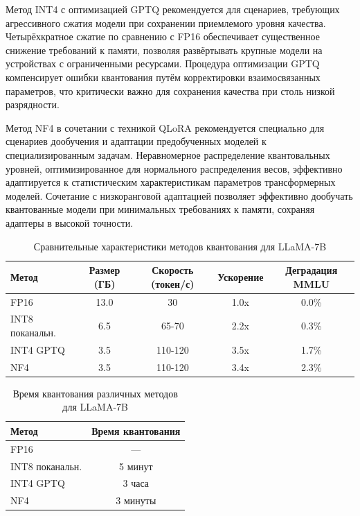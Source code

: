 \documentclass[bachelor, och, coursework]{SCWorks}
\begin{document}
	Метод INT4 с оптимизацией GPTQ рекомендуется для сценариев, требующих агрессивного сжатия модели при сохранении приемлемого уровня качества. Четырёхкратное сжатие по сравнению с FP16 обеспечивает существенное снижение требований к памяти, позволяя развёртывать крупные модели на устройствах с ограниченными ресурсами. Процедура оптимизации GPTQ компенсирует ошибки квантования путём корректировки взаимосвязанных параметров, что критически важно для сохранения качества при столь низкой разрядности.
	
	Метод NF4 в сочетании с техникой QLoRA рекомендуется специально для сценариев дообучения и адаптации предобученных моделей к специализированным задачам. Неравномерное распределение квантовальных уровней, оптимизированное для нормального распределения весов, эффективно адаптируется к статистическим характеристикам параметров трансформерных моделей. Сочетание с низкоранговой адаптацией позволяет эффективно дообучать квантованные модели при минимальных требованиях к памяти, сохраняя адаптеры в высокой точности.
	
	\begin{table}[!ht]
		\centering
		\footnotesize
		\caption{Сравнительные характеристики методов квантования для LLaMA-7B}
		\label{tab:comparative}
		\begin{tabular}{|l|c|c|c|c|}
			\hline
			Метод & Размер (ГБ) & Скорость (токен/с) & Ускорение & Деградация MMLU \\
			\hline
			FP16 & 13.0 & 30 & 1.0x & 0.0\% \\
			\hline
			INT8 поканальн. & 6.5 & 65-70 & 2.2x & 0.3\% \\
			\hline
			INT4 GPTQ & 3.5 & 110-120 & 3.5x & 1.7\% \\
			\hline
			NF4 & 3.5 & 110-120 & 3.4x & 2.3\% \\
			\hline
		\end{tabular}
	\end{table}
	
	\begin{table}[!ht]
		\centering
		\small
		\caption{Время квантования различных методов для LLaMA-7B}
		\label{tab:quantization_time}
		\begin{tabular}{|l|c|}
			\hline
			Метод & Время квантования \\
			\hline
			FP16 & — \\
			\hline
			INT8 поканальн. & 5 минут \\
			\hline
			INT4 GPTQ & 3 часа \\
			\hline
			NF4 & 3 минуты \\
			\hline
		\end{tabular}
	\end{table}
	
\end{document}
